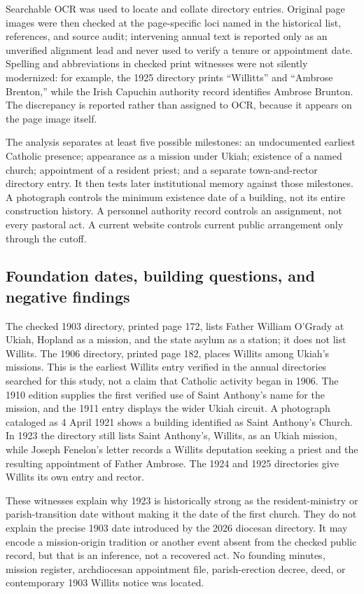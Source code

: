 Searchable OCR was used to locate and collate directory entries. Original page images were then checked at the page-specific loci named in the historical list, references, and source audit; intervening annual text is reported only as an unverified alignment lead and never used to verify a tenure or appointment date. Spelling and abbreviations in checked print witnesses were not silently modernized: for example, the 1925 directory prints ``Willitts'' and ``Ambrose Brenton,'' while the Irish Capuchin authority record identifies Ambrose Brunton. The discrepancy is reported rather than assigned to OCR, because it appears on the page image itself.

The analysis separates at least five possible milestones: an undocumented earliest Catholic presence; appearance as a mission under Ukiah; existence of a named church; appointment of a resident priest; and a separate town-and-rector directory entry. It then tests later institutional memory against those milestones. A photograph controls the minimum existence date of a building, not its entire construction history. A personnel authority record controls an assignment, not every pastoral act. A current website controls current public arrangement only through the cutoff.

\subsection{Foundation dates, building questions, and negative findings}

The checked 1903 directory, printed page 172, lists Father William O'Grady at Ukiah, Hopland as a mission, and the state asylum as a station; it does not list Willits. The 1906 directory, printed page 182, places Willits among Ukiah's missions. This is the earliest Willits entry verified in the annual directories searched for this study, not a claim that Catholic activity began in 1906. The 1910 edition supplies the first verified use of Saint Anthony's name for the mission, and the 1911 entry displays the wider Ukiah circuit. A photograph cataloged as 4 April 1921 shows a building identified as Saint Anthony's Church. In 1923 the directory still lists Saint Anthony's, Willits, as an Ukiah mission, while Joseph Fenelon's letter records a Willits deputation seeking a priest and the resulting appointment of Father Ambrose. The 1924 and 1925 directories give Willits its own entry and rector.

These witnesses explain why 1923 is historically strong as the resident-ministry or parish-transition date without making it the date of the first church. They do not explain the precise 1903 date introduced by the 2026 diocesan directory. It may encode a mission-origin tradition or another event absent from the checked public record, but that is an inference, not a recovered act. No founding minutes, mission register, archdiocesan appointment file, parish-erection decree, deed, or contemporary 1903 Willits notice was located.


